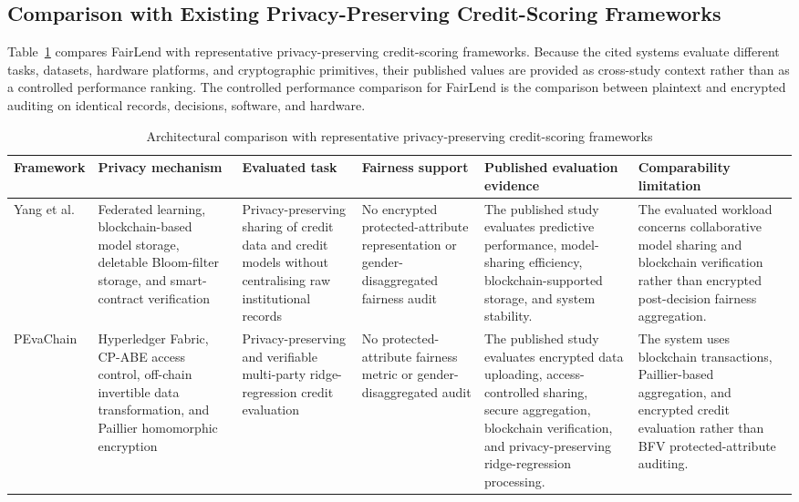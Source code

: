 \documentclass[a4paper,fleqn]{cas-dc}
\begin{document}
\subsection{Comparison with Existing Privacy-Preserving Credit-Scoring Frameworks} \label{subsec:comparative_ppcs} Table~\ref{tab:privacy_comparison} compares FairLend with representative privacy-preserving credit-scoring frameworks. Because the cited systems evaluate different tasks, datasets, hardware platforms, and cryptographic primitives, their published values are provided as cross-study context rather than as a controlled performance ranking. The controlled performance comparison for FairLend is the comparison between plaintext and encrypted auditing on identical records, decisions, software, and hardware. 


\begin{table}[htbp]
\centering
\caption{Architectural comparison with representative privacy-preserving
credit-scoring frameworks}
\label{tab:privacy_comparison}
\scriptsize
\renewcommand{\arraystretch}{1.15}

\begin{tabular}{
|p{1.8cm}
|p{2.5cm}
|p{2.5cm}
|p{2.3cm}
|p{3.2cm}
|p{2.8cm}|}
\hline

\textbf{Framework} &
\textbf{Privacy mechanism} &
\textbf{Evaluated task} &
\textbf{Fairness support} &
\textbf{Published evaluation evidence} &
\textbf{Comparability limitation} \\
\hline

Yang et al.~\cite{Yang2022privacy}
&
Federated learning, blockchain-based model storage, deletable Bloom-filter
storage, and smart-contract verification
&
Privacy-preserving sharing of credit data and credit models without
centralising raw institutional records
&
No encrypted protected-attribute representation or gender-disaggregated
fairness audit
&
The published study evaluates predictive performance, model-sharing
efficiency, blockchain-supported storage, and system stability.
&
The evaluated workload concerns collaborative model sharing and blockchain
verification rather than encrypted post-decision fairness aggregation.
\\
\hline

PEvaChain~\cite{qiao2023pevachain}
&
Hyperledger Fabric, CP-ABE access control, off-chain invertible data
transformation, and Paillier homomorphic encryption
&
Privacy-preserving and verifiable multi-party ridge-regression credit
evaluation
&
No protected-attribute fairness metric or gender-disaggregated audit
&
The published study evaluates encrypted data uploading, access-controlled
sharing, secure aggregation, blockchain verification, and privacy-preserving
ridge-regression processing.
&
The system uses blockchain transactions, Paillier-based aggregation, and
encrypted credit evaluation rather than BFV protected-attribute auditing.
\\
\hline


\end{tabular}
\end{table}
\end{document}
